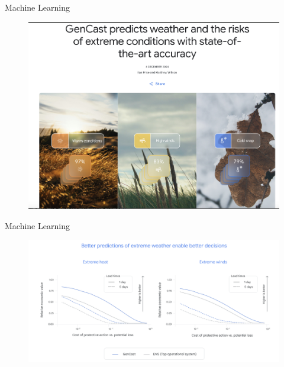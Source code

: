 \documentclass[10pt]{beamer}
\begin{document}
\begin{frame}{Machine Learning}
\footnotesize 
\begin{figure}[ht]
        \centering
        \includegraphics[width=\textwidth]{images/gencast_0}
\end{figure}
\end{frame}



\begin{frame}{Machine Learning}
\footnotesize 
\begin{figure}[ht]
        \centering
        \includegraphics[width=\textwidth]{images/gencast_1}
\end{figure}
\end{frame}
\end{document}

